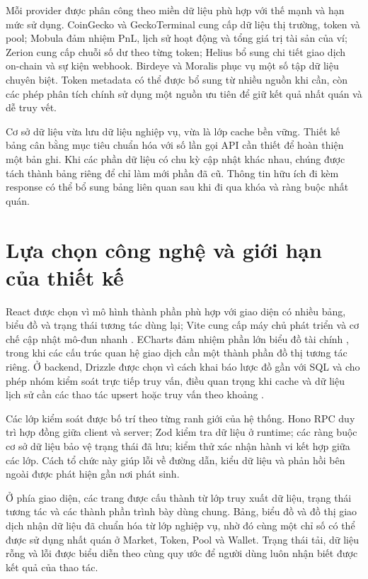 Mỗi provider được phân công theo miền dữ liệu phù hợp với thế mạnh và hạn mức sử dụng. CoinGecko và GeckoTerminal cung cấp dữ liệu thị trường, token và pool; Mobula đảm nhiệm PnL, lịch sử hoạt động và tổng giá trị tài sản của ví; Zerion cung cấp chuỗi số dư theo từng token; Helius bổ sung chi tiết giao dịch on-chain và sự kiện webhook. Birdeye và Moralis phục vụ một số tập dữ liệu chuyên biệt. Token metadata có thể được bổ sung từ nhiều nguồn khi cần, còn các phép phân tích chính sử dụng một nguồn ưu tiên để giữ kết quả nhất quán và dễ truy vết.

Cơ sở dữ liệu vừa lưu dữ liệu nghiệp vụ, vừa là lớp cache bền vững. Thiết kế bảng cân bằng mục tiêu chuẩn hóa với số lần gọi API cần thiết để hoàn thiện một bản ghi. Khi các phần dữ liệu có chu kỳ cập nhật khác nhau, chúng được tách thành bảng riêng để chỉ làm mới phần đã cũ. Thông tin hữu ích đi kèm response có thể bổ sung bảng liên quan sau khi đi qua khóa và ràng buộc nhất quán.



\section{Lựa chọn công nghệ và giới hạn của thiết kế}

React được chọn vì mô hình thành phần phù hợp với giao diện có nhiều bảng, biểu đồ và trạng thái tương tác dùng lại; Vite cung cấp máy chủ phát triển và cơ chế cập nhật mô-đun nhanh \cite{react,vite}. ECharts đảm nhiệm phần lớn biểu đồ tài chính \cite{echarts}, trong khi các cấu trúc quan hệ giao dịch cần một thành phần đồ thị tương tác riêng. Ở backend, Drizzle được chọn vì cách khai báo lược đồ gần với SQL và cho phép nhóm kiểm soát trực tiếp truy vấn, điều quan trọng khi cache và dữ liệu lịch sử cần các thao tác upsert hoặc truy vấn theo khoảng \cite{drizzle}.

Các lớp kiểm soát được bố trí theo từng ranh giới của hệ thống. Hono RPC duy trì hợp đồng giữa client và server; Zod kiểm tra dữ liệu ở runtime; các ràng buộc cơ sở dữ liệu bảo vệ trạng thái đã lưu; kiểm thử xác nhận hành vi kết hợp giữa các lớp. Cách tổ chức này giúp lỗi về đường dẫn, kiểu dữ liệu và phản hồi bên ngoài được phát hiện gần nơi phát sinh.

Ở phía giao diện, các trang được cấu thành từ lớp truy xuất dữ liệu, trạng thái tương tác và các thành phần trình bày dùng chung. Bảng, biểu đồ và đồ thị giao dịch nhận dữ liệu đã chuẩn hóa từ lớp nghiệp vụ, nhờ đó cùng một chỉ số có thể được sử dụng nhất quán ở Market, Token, Pool và Wallet. Trạng thái tải, dữ liệu rỗng và lỗi được biểu diễn theo cùng quy ước để người dùng luôn nhận biết được kết quả của thao tác.

